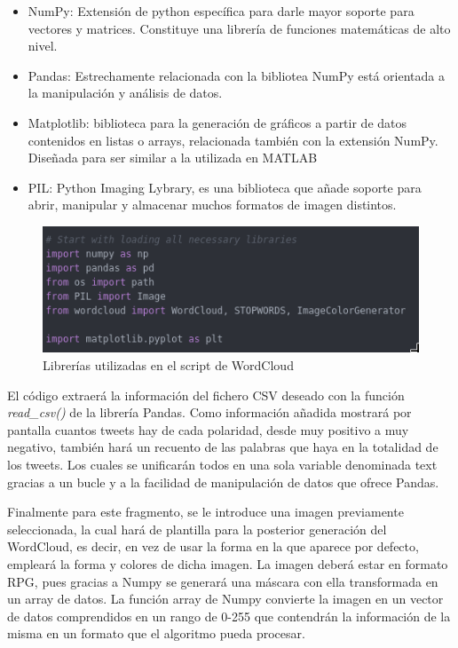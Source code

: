 \begin{itemize}
	\item NumPy: Extensión de python específica para darle mayor soporte para vectores y matrices. Constituye una librería de funciones matemáticas de alto nivel.
	\item Pandas: Estrechamente relacionada con la bibliotea NumPy está orientada a la manipulación y análisis de datos. 	
	\item Matplotlib: biblioteca para la generación de gráficos a partir de datos contenidos en listas o arrays, relacionada también con la extensión NumPy. Diseñada para ser similar a la utilizada en MATLAB
	\item PIL: Python Imaging Lybrary, es una biblioteca que añade soporte para abrir, manipular y almacenar muchos formatos de imagen distintos. 
	
\end{itemize}


\begin{figure}[H]
	\centering
	\includegraphics[scale=.5]{imagenes/include-words.png}
	\caption{Librerías utilizadas en el script de WordCloud}
	\label{fig:include-words}
\end{figure}


El código extraerá la información del fichero CSV deseado con la función \textit{read\_csv()} de la librería Pandas. Como información añadida mostrará por pantalla cuantos tweets hay de cada polaridad, desde muy positivo a muy negativo, también hará un recuento de las palabras que haya en la totalidad de los tweets. Los cuales se unificarán todos en una sola variable denominada text gracias a un bucle y a la facilidad de manipulación de datos que ofrece Pandas.
 
 Finalmente para este fragmento, se le introduce una imagen previamente seleccionada, la cual hará de plantilla para la posterior generación del WordCloud, es decir, en vez de usar la forma en la que aparece por defecto, empleará la forma y colores de dicha imagen. La imagen deberá estar en formato RPG, pues gracias a Numpy se generará una máscara con ella transformada en un array de datos. La función array de Numpy convierte la imagen en un vector de datos comprendidos en un rango de 0-255 que contendrán la información de la misma en un formato que el algoritmo pueda procesar.

